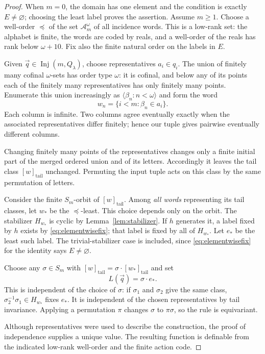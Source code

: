 \documentclass[11pt,letterpaper]{article}
\theoremstyle{definition}
\numberwithin{equation}{section}
\newcommand{\Inj}{\operatorname{Inj}}
\begin{document}
\begin{proof}
When $m=0$, the domain has one element and the condition is exactly $E\ne\varnothing$; choosing the least label proves the assertion. Assume $m\ge1$. Choose a well-order $\preceq$ of the set $\mathcal A_m^\omega$ of all incidence words. This is a low-rank set: the alphabet is finite, the words are coded by reals, and a well-order of the reals has rank below $\omega+10$. Fix also the finite natural order on the labels in $E$.

Given $\vec q\in\Inj(m,Q_\lambda)$, choose representatives $a_i\in q_i$. The union of finitely many cofinal $\omega$-sets has order type $\omega$: it is cofinal, and below any of its points each of the finitely many representatives has only finitely many points. Enumerate this union increasingly as $\langle\beta_n:n<\omega\rangle$ and form the word
\[
 w_n=\{i<m:\beta_n\in a_i\}.
\]
Each column is infinite. Two columns agree eventually exactly when the associated representatives differ finitely; hence our tuple gives pairwise eventually different columns.

Changing finitely many points of the representatives changes only a finite initial part of the merged ordered union and of its letters. Accordingly it leaves the tail class $[w]_{\mathrm{tail}}$ unchanged. Permuting the input tuple acts on this class by the same permutation of letters.

Consider the finite $S_m$-orbit of $[w]_{\mathrm{tail}}$. Among \emph{all words} representing its tail classes, let $w_*$ be the $\preceq$-least. This choice depends only on the orbit. The stabilizer $H_{w_*}$ is cyclic by Lemma~\ref{lem:stabilizer}. If $h$ generates it, a label fixed by $h$ exists by \eqref{eq:elementwisefix}; that label is fixed by all of $H_{w_*}$. Let $e_*$ be the least such label. The trivial-stabilizer case is included, since \eqref{eq:elementwisefix} for the identity says $E\ne\varnothing$.

Choose any $\sigma\in S_m$ with
$[w]_{\mathrm{tail}}=\sigma\cdot[w_*]_{\mathrm{tail}}$ and set
\[
 L(\vec q)=\sigma\cdot e_*.
\]
This is independent of the choice of $\sigma$: if $\sigma_1$ and $\sigma_2$ give the same class, $\sigma_2^{-1}\sigma_1\in H_{w_*}$ fixes $e_*$. It is independent of the chosen representatives by tail invariance. Applying a permutation $\pi$ changes $\sigma$ to $\pi\sigma$, so the rule is equivariant.

Although representatives were used to describe the construction, the proof of independence supplies a unique value. The resulting function is definable from the indicated low-rank well-order and the finite action code.
\end{proof}
\end{document}
